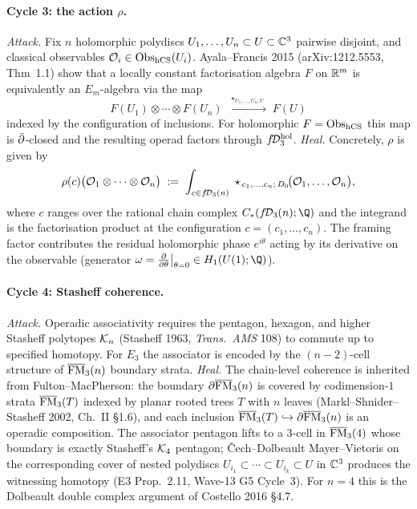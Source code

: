 \paragraph{Cycle 3: the action $\rho$.}
\emph{Attack.} Fix $n$ holomorphic polydiscs $U_1,\ldots,U_n
\subset U \subset \mathbb{C}^3$ pairwise disjoint, and classical
observables $\mathcal{O}_i \in \mathrm{Obs}_{\mathrm{hCS}}(U_i)$. Ayala--Francis 2015
(arXiv:1212.5553, Thm~1.1) show that a locally constant
factorisation algebra $F$ on $\mathbb{R}^m$ is equivalently an
$E_m$-algebra via the map
\[
  F(U_1) \otimes \cdots \otimes F(U_n)
  \;\xrightarrow{\;\star_{U_1,\ldots,U_n;U}\;}\;
  F(U)
\]
indexed by the configuration of inclusions. For holomorphic
$F = \mathrm{Obs}_{\mathrm{hCS}}$ this map is $\bar\partial$-closed and the resulting
operad factors through $f\!\mathcal{D}_3^{\mathrm{hol}}$.
\emph{Heal.} Concretely, $\rho$ is given by
\[
  \rho(c)\bigl(\mathcal{O}_1 \otimes \cdots \otimes \mathcal{O}_n\bigr)
  \;:=\;\int_{c \in f\!\mathcal{D}_3(n)} \;
    \star_{\,c_1,\ldots,c_n;\,D_0}\!\bigl(\mathcal{O}_1,\ldots,\mathcal{O}_n\bigr),
\]
where $c$ ranges over the rational chain complex $C_*(\fD_3(n);\Q)$
and the integrand is the factorisation product at the configuration
$c = (c_1,\ldots,c_n)$. The framing factor contributes the residual
holomorphic phase $e^{i\theta}$ acting by its derivative on the
observable (generator $\omega = \frac{\partial}{\partial \theta}\big|_{\theta=0}
\in H_1(U(1);\Q)$).

\paragraph{Cycle 4: Stasheff coherence.}
\emph{Attack.} Operadic associativity requires the pentagon,
hexagon, and higher Stasheff polytopes $\mathcal{K}_n$ (Stasheff 1963,
\emph{Trans.\ AMS} 108) to commute up to specified homotopy.
For $E_3$ the associator is encoded by the $(n-2)$-cell structure
of $\overline{\mathrm{FM}}_3(n)$ boundary strata.
\emph{Heal.} The chain-level coherence is inherited from
Fulton--MacPherson: the boundary $\partial \overline{\mathrm{FM}}_3(n)$ is covered
by codimension-$1$ strata $\overline{\mathrm{FM}}_3(T)$ indexed by planar rooted
trees $T$ with $n$ leaves (Markl--Shnider--Stasheff 2002, Ch.~II
\S1.6), and each inclusion $\overline{\mathrm{FM}}_3(T) \hookrightarrow \partial \overline{\mathrm{FM}}_3(n)$
is an operadic composition. The associator pentagon lifts to
a $3$-cell in $\overline{\mathrm{FM}}_3(4)$ whose boundary is exactly Stasheff's
$\mathcal{K}_4$ pentagon; Čech--Dolbeault Mayer--Vietoris on the
corresponding cover of nested polydiscs $U_{i_1} \subset \cdots
\subset U_{i_k} \subset U$ in $\mathbb{C}^3$ produces the witnessing
homotopy (E3 Prop.~2.11, Wave-13 G5 Cycle~3). For $n = 4$
this is the Dolbeault double complex argument of Costello
2016 \S4.7.

